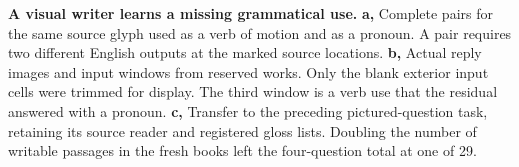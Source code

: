 \textbf{A visual writer learns a missing grammatical use.}
\textbf{a,} Complete pairs for the same source glyph used as a verb of motion and as a pronoun. A pair requires two different English outputs at the marked source locations. \textbf{b,} Actual reply images and input windows from reserved works. Only the blank exterior input cells were trimmed for display. The third window is a verb use that the residual answered with a pronoun. \textbf{c,} Transfer to the preceding pictured-question task, retaining its source reader and registered gloss lists. Doubling the number of writable passages in the fresh books left the four-question total at one of 29.
